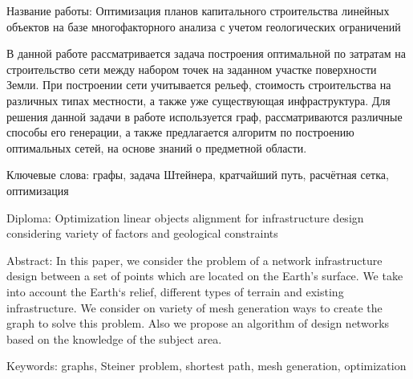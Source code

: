 \newpage
Название работы: Оптимизация планов капитального строительства линейных объектов на базе многофакторного анализа с учетом геологических ограничений

В данной работе рассматривается задача построения оптимальной по затратам на строительство сети между набором точек на заданном участке поверхности Земли. При построении сети учитывается рельеф, стоимость строительства на различных типах местности, а также уже существующая инфраструктура. Для решения данной задачи в работе используется граф, рассматриваются различные способы его генерации, а также предлагается алгоритм по построению оптимальных сетей, на основе знаний о предметной области.

Ключевые слова: графы, задача Штейнера, кратчайший путь, расчётная сетка, оптимизация

\newpage
Diploma: Optimization linear objects alignment for infrastructure design considering variety of factors and geological constraints

Abstract: In this paper, we consider the problem of a network infrastructure design between a set of points which are located on the Earth's surface. We take into account the Earth`s relief, different types of terrain and existing infrastructure. We consider on variety of mesh generation ways to create the graph to solve this problem. Also we propose an algorithm of design networks based on the knowledge of the subject area.

Keywords: graphs, Steiner problem, shortest path, mesh generation, optimization
